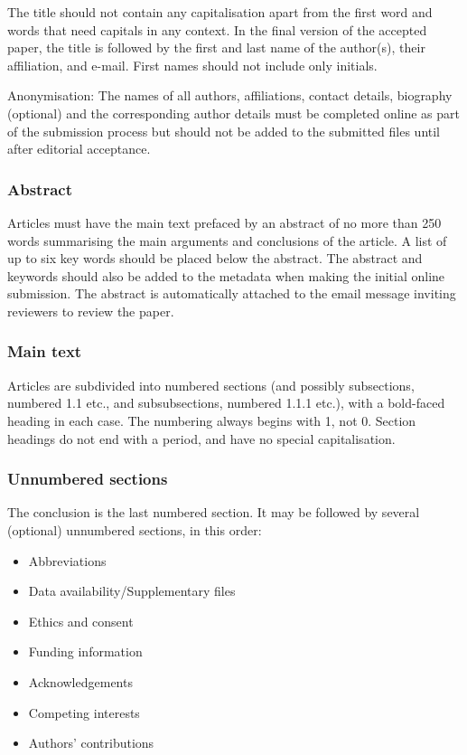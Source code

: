 \documentclass[]{glossa}
\begin{document}
The title should not contain any capitalisation apart from the first
word and words that need capitals in any context. In the final version
of the accepted paper, the title is followed by the first and last name
of the author(s), their affiliation, and e-mail. First names should not
include only initials.

Anonymisation: The names of all authors, affiliations, contact details,
biography (optional) and the corresponding author details must be
completed online as part of the submission process but should not be
added to the submitted files until after editorial acceptance.

\hypertarget{abstract}{%
\subsubsection{Abstract}\label{abstract}}

Articles must have the main text prefaced by an abstract of no more than
250 words summarising the main arguments and conclusions of the article.
A list of up to six key words should be placed below the abstract. The
abstract and keywords should also be added to the metadata when making
the initial online submission. The abstract is automatically attached to
the email message inviting reviewers to review the paper.

\hypertarget{main-text}{%
\subsubsection{Main text}\label{main-text}}

Articles are subdivided into numbered sections (and possibly
subsections, numbered 1.1 etc., and subsubsections, numbered 1.1.1
etc.), with a bold-faced heading in each case. The numbering always
begins with 1, not 0. Section headings do not end with a period, and
have no special capitalisation.

\hypertarget{unnumbered-sections}{%
\subsubsection{Unnumbered sections}\label{unnumbered-sections}}

The conclusion is the last numbered section. It may be followed by
several (optional) unnumbered sections, in this order:

\begin{itemize}
\item
  Abbreviations
\item
  Data availability/Supplementary files
\item
  Ethics and consent
\item
  Funding information
\item
  Acknowledgements
\item
  Competing interests
\item
  Authors' contributions
\end{itemize}
\end{document}
